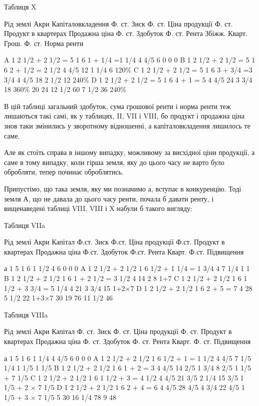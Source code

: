 Таблиця X

Рід землі
Акри
Капіталовкладення  Ф. ст.
Зиск Ф. ст.
Ціна продукції Ф. ст.
Продукт в квартерах
Продажна ціна Ф. ст.
Здобуток Ф. ст.
Рента
Збіжж. Кварт.
Грош. Ф. ст.
Норма ренти

A 1 2 1/2 + 2 1/2 = 5  1  6  1 + 1/4 =1 1/4     4 4/5   6     0         0     0
B 1 2 1/2 + 2 1/2 = 5  1  6  2 + 1/2 = 2 1/2    4 4/5   12  1 1/4   6     120\%
C 1 2 1/2 + 2 1/2 = 5  1  6  3 + 3/4 =3  3/4    4 4/5   18  2 1/2   12   240\%
D 1 2 1/2 + 2 1/2 = 5  1  6  4 + 1 = 5              4 4/5    24  3 3/4   18  360\%
                           20     24                  12 1/2                  60  7 1/2   36  240\%

В цій таблиці загальний здобуток, сума грошової ренти і норма ренти
теж лишаються такі самі, як у таблицях, II, VII і VIII, бо продукт і продажна
ціна знов таки змінились у зворотному відношенні, а капіталовкладення лишилось
те саме.

Але як стоїть справа в іншому випадку, можливому за висхідної ціни
продукції, а саме в тому випадку, коли гірша земля, яку до цього часу не
варто було обробляти, тепер починає оброблятись.

Припустімо, що така земля, яку ми позначимо а, вступає в конкуренцію.
Тоді земля А, що не давала до цього часу ренти, почала б давати ренту, і
вищенаведені таблиці VIII, VIII і X набули б такого вигляду:

Таблиця VIIa

Рід землі
Акри
Капітал Ф.ст.
Зиск Ф.ст.
Ціна продукції Ф.ст.
Продукт в квартерах
Продажна ціна Ф.ст.
Здобуток Ф.ст.
Рента
Кварт.
Ф.ст.
Підвищення

а 1               5          1 6                           1 1/2      4  6     0           0    0
A 1  2 1/2 + 2 1/2  1  6   1/2 + 1 1/4 = 1 3/4      4  7    1/4        1     1
B 1  2 1/2 + 2 1/2  1  6   1 + 2 1/2 = 3 1/2          4  14  2           8     1+7
C 1  2 1/2 + 2 1/2  1  6   1 1/2 + 3 3/4 = 5 1/4   4  21  3 3/4    15   1+2×7
D 1  2 1/2 + 2 1/2  1  6   2 + 5 = 7                       4  28  5 1/2    22   1+3×7
                                30              19                             76  11 1/2  46

Таблиця VIIIa

Рід землі
Акри
Капітал Ф. ст.
Зиск Ф. ст.
Ціна продукції Ф. ст.
Продукт в квартерах
Продажна ціна Ф. ст.
Здобуток Ф. ст.
Рента Кварт. Ф. ст.
Підвищення

а  1                      5   1  6                     1 1/4     4 4/5   6            0            0
           0
A  1  2 1/2 + 2 1/2  1  6   1/2  + 1  = 1 1/2     4 4/5   7 1/5     1/4         1 1/5     1 1/5
B  1  2 1/2 + 2 1/2  1  6    1 + 2  = 3                4 4/5   14 2/5   1 3/4     8 2/5      1 1/5 +
7 1/5
C  1  2 1/2 + 2 1/2  1  6    1 1/2 + 3 = 4 1/2   4 4/5   21 3/5    2 1/4    15 3/5    1 1/5 + 2 × 7
1/5
D  1  2 1/2 + 2 1/2  1  6    2 + 4 = 6                4 4/5    28 4/5    4 3/4    22 4/5   1 1/5 + 3
× 7 1/5
     5                              30              16 1/4                     78           9       
   48
